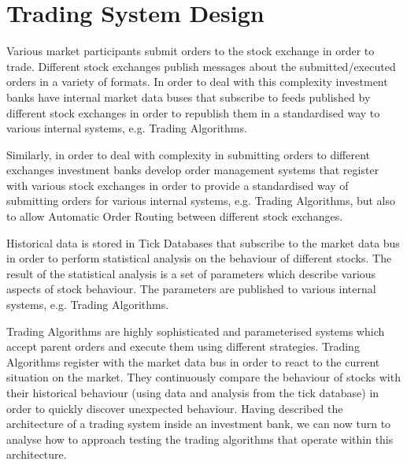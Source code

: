 \section{Trading System Design} 

Various market participants submit orders to the stock exchange in order to trade. Different stock exchanges publish messages about the submitted/executed orders in a variety of formats. In order to deal with this complexity investment banks have internal market data buses that subscribe to feeds published by different stock exchanges in order to republish them in a standardised way to various internal systems, e.g. Trading Algorithms.

Similarly, in order to deal with complexity in submitting orders to different exchanges investment banks develop order management systems that register with various stock exchanges in order to provide a standardised way of submitting orders for various internal systems, e.g. Trading Algorithms, but also to allow Automatic Order Routing between different stock exchanges.

Historical data is stored in Tick Databases that subscribe to the market data bus in order to perform statistical analysis on the behaviour of different stocks. The result of the statistical analysis is a set of parameters which describe various aspects of stock behaviour. The parameters are published to various internal systems, e.g. Trading Algorithms.

Trading Algorithms are highly sophisticated and parameterised systems which accept parent orders and execute them using different strategies. Trading Algorithms register with the market data bus in order to react to the current situation on the market. They continuously compare the behaviour of stocks with their historical behaviour (using data and analysis from the tick database) in order to quickly discover unexpected behaviour. Having described the architecture of a trading system inside an investment bank, we can now turn to analyse how to approach testing the trading algorithms that operate within this architecture.
